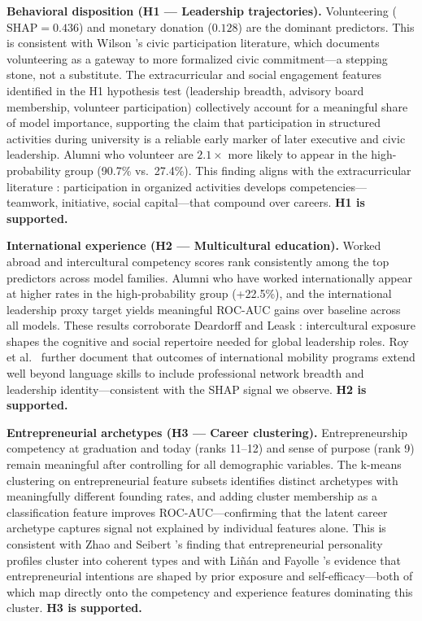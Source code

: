 \documentclass[10pt,twocolumn]{article}
\begin{document}
\textbf{Behavioral disposition (H1 — Leadership trajectories).} Volunteering ($\text{SHAP} = 0.436$) and monetary donation ($0.128$) are the dominant predictors. This is consistent with Wilson \cite{schmid2025}'s civic participation literature, which documents volunteering as a gateway to more formalized civic commitment—a stepping stone, not a substitute. The extracurricular and social engagement features identified in the H1 hypothesis test (leadership breadth, advisory board membership, volunteer participation) collectively account for a meaningful share of model importance, supporting the claim that participation in structured activities during university is a reliable early marker of later executive and civic leadership. Alumni who volunteer are $2.1\times$ more likely to appear in the high-probability group (90.7\% vs.\ 27.4\%). This finding aligns with the extracurricular literature \cite{binani2024}: participation in organized activities develops competencies—teamwork, initiative, social capital—that compound over careers. \textbf{H1 is supported.}

\textbf{International experience (H2 — Multicultural education).} Worked abroad and intercultural competency scores rank consistently among the top predictors across model families. Alumni who have worked internationally appear at higher rates in the high-probability group (+22.5\%), and the international leadership proxy target yields meaningful ROC-AUC gains over baseline across all models. These results corroborate Deardorff \cite{maltseva2022} and Leask \cite{udayar2025}: intercultural exposure shapes the cognitive and social repertoire needed for global leadership roles. Roy et al.\ \cite{udayar2025} further document that outcomes of international mobility programs extend well beyond language skills to include professional network breadth and leadership identity—consistent with the SHAP signal we observe. \textbf{H2 is supported.}

\textbf{Entrepreneurial archetypes (H3 — Career clustering).} Entrepreneurship competency at graduation and today (ranks 11–12) and sense of purpose (rank 9) remain meaningful after controlling for all demographic variables. The k-means clustering on entrepreneurial feature subsets identifies distinct archetypes with meaningfully different founding rates, and adding cluster membership as a classification feature improves ROC-AUC—confirming that the latent career archetype captures signal not explained by individual features alone. This is consistent with Zhao and Seibert \cite{oliveira2020}'s finding that entrepreneurial personality profiles cluster into coherent types and with Liñán and Fayolle \cite{sullivan2021}'s evidence that entrepreneurial intentions are shaped by prior exposure and self-efficacy—both of which map directly onto the competency and experience features dominating this cluster. \textbf{H3 is supported.}
\end{document}
